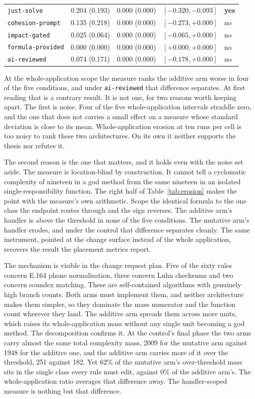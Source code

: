 \documentclass[11pt,a4paper]{article}
\begin{document}
\begin{table}[t]
\begin{tabular}{lrrrl}
\texttt{just-solve}       & 0.204 (0.193) & 0.000 (0.000) & $[-0.320, -0.093]$ & \textbf{yes} \\
\texttt{cohesion-prompt}  & 0.135 (0.218) & 0.000 (0.000) & $[-0.273, +0.000]$ & no \\
\texttt{impact-gated}     & 0.025 (0.064) & 0.000 (0.000) & $[-0.065, +0.000]$ & no \\
\texttt{formula-provided} & 0.000 (0.000) & 0.000 (0.000) & $[+0.000, +0.000]$ & no \\
\texttt{ai-reviewed}      & 0.074 (0.171) & 0.000 (0.000) & $[-0.178, +0.000]$ & no \\
\bottomrule
\end{tabular}
\end{table}

At the whole-application scope the measure ranks the additive arm worse in four
of the five conditions, and under \texttt{ai-reviewed} that difference separates.
At first reading that is a contrary result. It is not one, for two reasons worth
keeping apart. The first is noise. Four of the five whole-application intervals
straddle zero, and the one that does not carries a small effect on a measure
whose standard deviation is close to its mean. Whole-application erosion at ten
runs per cell is too noisy to rank these two architectures. On its own it neither
supports the thesis nor refutes it.

The second reason is the one that matters, and it holds even with the noise set
aside. The measure is location-blind by construction. It cannot tell a cyclomatic
complexity of nineteen in a god method from the same nineteen in an isolated
single-responsibility function. The right half of Table~\ref{tab:erosion} makes
the point with the measure's own arithmetic. Scope the identical formula to the
one class the endpoint routes through and the sign reverses. The additive arm's
handler is above the threshold in none of the five conditions. The mutative arm's
handler erodes, and under the control that difference separates cleanly. The same
instrument, pointed at the change surface instead of the whole application,
recovers the result the placement metrics report.

The mechanism is visible in the change request plan. Five of the sixty rules
concern E.164 phone normalisation, three concern Luhn checksums and two concern
soundex matching. These are self-contained algorithms with genuinely high branch
counts. Both arms must implement them, and neither architecture makes them
simpler, so they dominate the mass numerator and the function count wherever they
land. The additive arm spreads them across more units, which raises its
whole-application mass without any single unit becoming a god method. The
decomposition confirms it. At the control's final phase the two arms carry almost
the same total complexity mass, 2009 for the mutative arm against 1948 for the
additive one, and the additive arm carries more of it over the threshold, 251
against 182. Yet 62\% of the mutative arm's over-threshold mass sits in the single
class every rule must edit, against 0\% of the additive arm's. The
whole-application ratio averages that difference away. The handler-scoped measure
is nothing but that difference.
\end{document}
